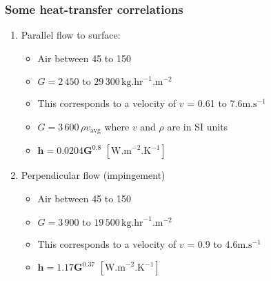 \begin{frame}\frametitle{Some heat-transfer correlations}
	{\color{myRed}{Alert: awkward units!}}
	\begin{enumerate}
		\item	Parallel flow to surface:
		\begin{itemize}
			\item	Air between 45 to 150\degC
			\item	$G = 2\,450\text{~to~}29\,300\, \text{kg.hr}^{-1}\text{.m}^{-2}$
			\item	This corresponds to a velocity of $v$ = 0.61 to 7.6$\text{m.s}^{-1}$
			\item	$G = 3\,600\,\rho v_\text{avg}$ where $v$ and $\rho$ are in SI units
			\vspace{5pt}
			\item	$\mathbf{h = 0.0204G^{0.8}}\,\,[\text{W.m}^{-2}\text{.K}^{-1}]$
		\end{itemize}
		\vspace{24pt}
		\item	Perpendicular flow (impingement)
		\begin{itemize}
			\item	Air between 45 to 150\degC
			\item	$G = 3\,900\text{~to~}19\,500\, \text{kg.hr}^{-1}\text{.m}^{-2}$
			\item	This corresponds to a velocity of $v$ = 0.9 to 4.6$\text{m.s}^{-1}$
			\vspace{5pt}
			\item	$\mathbf{h = 1.17G^{0.37}}\,\,[\text{W.m}^{-2}\text{.K}^{-1}]$
		\end{itemize}
	\end{enumerate}
\end{frame}

